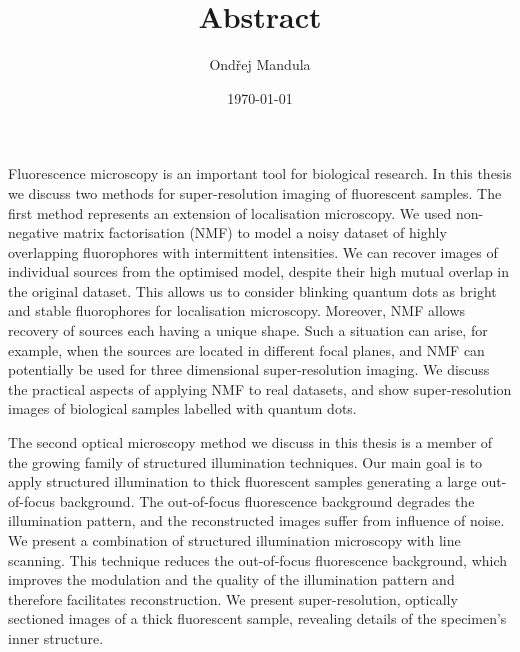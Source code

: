 \documentclass[11pt]{article}
\title{Abstract}
\author{Ond\v rej Mandula}
\date{\today}                                           %
\begin{document}
\maketitle

%
%
%

Fluorescence microscopy is an important tool for biological research. In this thesis we discuss two methods for super-resolution imaging of fluorescent samples. The first method represents an extension of localisation microscopy. We used non-negative matrix factorisation (NMF) to model a noisy dataset of highly overlapping fluorophores with intermittent intensities. We can recover images of individual sources from the optimised model, despite their high mutual overlap in the original dataset. This allows us to consider blinking quantum dots as bright and stable fluorophores for localisation microscopy. Moreover, NMF allows recovery of sources each having a unique shape. Such a situation can arise, for example, when the sources are located in different focal planes, and NMF can potentially be used for three dimensional super-resolution imaging. We discuss the practical aspects of applying NMF to real datasets, and show super-resolution images of biological samples labelled with quantum dots.

The second optical microscopy method we discuss in this thesis is a member of the growing family of structured illumination techniques. Our main goal is to apply structured illumination to thick fluorescent samples generating a large out-of-focus background. The out-of-focus fluorescence background degrades the illumination pattern, and the reconstructed images suffer from influence of noise. We present a combination of structured illumination microscopy with line scanning. This technique reduces the out-of-focus fluorescence background, which improves the modulation and the quality of the illumination pattern and therefore facilitates reconstruction. We present super-resolution, optically sectioned images of a thick fluorescent sample, revealing details of the specimen's inner structure. 
\end{document}
